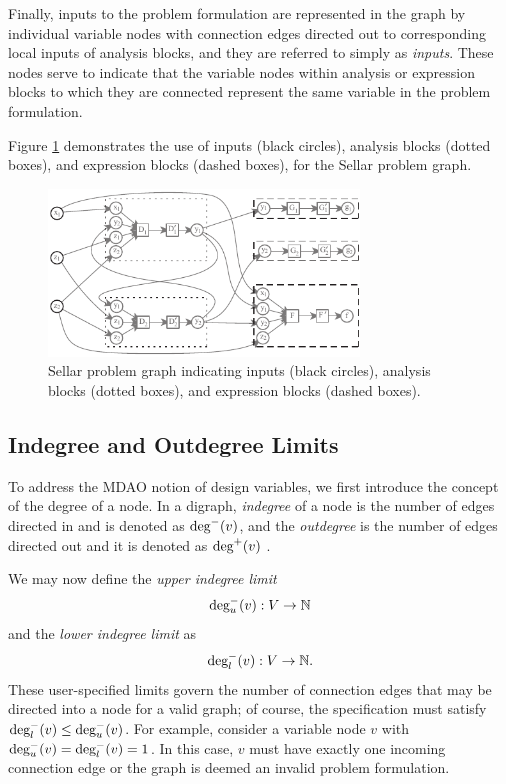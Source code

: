   Finally, inputs to the problem formulation are represented in the graph by individual 
  variable nodes with connection edges directed out to corresponding local inputs of 
  analysis blocks, and they are referred to simply as \emph{inputs}. 
  These nodes serve to indicate that the variable nodes within analysis or 
  expression blocks to which they are connected represent the same variable in the 
  problem formulation.

  Figure \ref{f:obj-cons} demonstrates the use of inputs (black circles), analysis 
  blocks (dotted boxes), and expression blocks (dashed boxes), for the Sellar problem 
  graph.
  \begin{figure}[htb!]
    \begin{center}
      \includegraphics[width=3.25in]{images/sellar_obj_and_cons}
    \end{center}
    \caption{Sellar problem graph indicating inputs (black circles), analysis blocks 
    (dotted boxes), and expression blocks (dashed boxes).}
  \label{f:obj-cons}
  \end{figure} 

\subsection{Indegree and Outdegree Limits}
  \label{s:indegree-outdegree}
	To address the MDAO notion of design variables, we first introduce the concept of the 
  degree of a node. In a digraph, \emph{indegree} of a node is the number of edges 
  directed in and is denoted as $\textrm{deg}^-(v)$, and the \emph{outdegree} 
  is the number of edges directed out and it is denoted as $\textrm{deg}^+(v)$ \cite{Diestel2010}.

  We may now define the \emph{upper indegree limit} 
  \begin{equation}
  \textrm{deg}_u^-(v):V \to \mathbb{N}
  \end{equation} 
  and the \emph{lower indegree limit} as
  \begin{equation}
  \textrm{deg}_l^-(v):V \to \mathbb{N}.
  \end{equation}
  These user-specified limits govern the number of connection edges that may 
  be directed into a node for a valid graph; of course, the specification must 
  satisfy $\textrm{deg}_l^-(v) \leq \textrm{deg}_u^-(v)$.
  For example, consider a variable node $v$ with $\textrm{deg}_u^-(v) = \textrm{deg}_l^-(v) = 1$. 
  In this case, $v$ must have exactly one incoming connection edge or the graph is 
  deemed an invalid problem formulation. 


